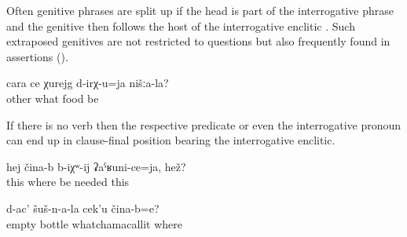 Often genitive phrases are split up if the head is part of the interrogative phrase and the genitive then follows the host of the interrogative enclitic . Such extraposed genitives are not restricted to questions but also frequently found in assertions (). 
%
\begin{exe}
	\ex	\label{ex:‎What other dishes do we have}
	\gll	cara	ce	χurejg	d-irχ-u=ja	nišːa-la?\\
		other	what	food	be	\\
	\glt	{}
\end{exe}

If there is no verb then the respective predicate or even the interrogative pronoun can end up in clause-final position bearing the interrogative enclitic.
%
\begin{exe}
	\ex	\label{ex:‎This where should it be}
	\gll	hej	čina-b	b-iχʷ-ij	ʡaˁʁuni-ce=ja,	hež?\\
		this	where	be	needed	this\\
	\glt	{}

	\ex	\label{ex:‎Where is this (picture) of the empty bottles}
	\gll	d-ac'	šuš-n-a-la	cek'u	čina-b=e?\\
		empty	bottle	whatchamacallit	where\\
	\glt	{}
\end{exe}

